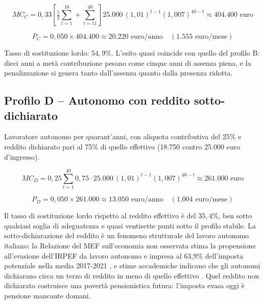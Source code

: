 \[
MC_C = 0{,}33 \left[ \tfrac{1}{2}\sum_{t=1}^{10} + \sum_{t=11}^{40} \right]
25.000\,(1{,}01)^{t-1}(1{,}007)^{40-t} \approx 404.400 \text{ euro}
\]

\[
P_C = 0{,}050 \times 404.400 \approx 20.220 \text{ euro/anno}
\quad (1.555 \text{ euro/mese})
\]

Tasso di sostituzione lordo: $54{,}9\%$. L'esito quasi coincide con quello del
profilo B: dieci anni a metà contribuzione pesano come cinque anni di assenza
piena, e la penalizzazione si genera tanto dall'assenza quanto dalla presenza
ridotta.

\subsection*{Profilo D -- Autonomo con reddito sotto-dichiarato}

\noindent
Lavoratore autonomo per quarant'anni, con aliquota contributiva del 25\% e
reddito dichiarato pari al 75\% di quello effettivo (18.750 contro 25.000 euro
d'ingresso).

\[
MC_D = 0{,}25 \sum_{t=1}^{40} 0{,}75 \cdot 25.000\,(1{,}01)^{t-1}(1{,}007)^{40-t}
\approx 261.000 \text{ euro}
\]

\[
P_D = 0{,}050 \times 261.000 \approx 13.050 \text{ euro/anno}
\quad (1.004 \text{ euro/mese})
\]

Il tasso di sostituzione lordo rispetto al reddito effettivo è del $35{,}4\%$,
ben sotto qualsiasi soglia di adeguatezza e quasi ventisette punti sotto il
profilo stabile. La sotto-dichiarazione del reddito è un fenomeno strutturale del lavoro
autonomo italiano: la Relazione del MEF sull'economia non osservata stima la
propensione all'evasione dell'IRPEF da lavoro autonomo e impresa al 63,9\%
dell'imposta potenziale nella media 2017-2021 \cite{MEF_EvasioneFiscale2024}, e
stime accademiche indicano che gli autonomi dichiarano circa un terzo di reddito
in meno di quello effettivo \cite{Albarea2020}. Quel reddito non dichiarato
costruisce una povertà pensionistica futura: l'imposta evasa oggi è pensione
mancante domani.

